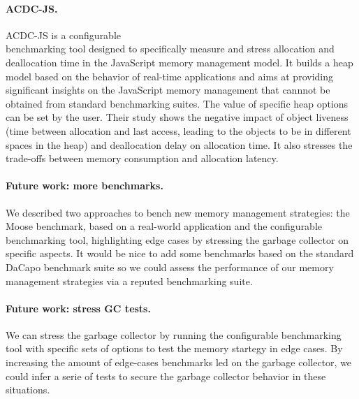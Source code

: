 \documentclass[10pt, sigplan]{acmart}
\begin{document}
%


\paragraph{ACDC-JS.}
ACDC-JS \cite{ACDCJS} is a configurable \\benchmarking tool designed to specifically measure and stress allocation and deallocation time in the JavaScript memory management model. 
It builds a heap model based on the behavior of real-time applications and aims at providing significant insights on the JavaScript memory management that cannnot be obtained from standard benchmarking suites. The value of specific heap options can be set by the user. 
Their study shows the negative impact of object liveness (time between allocation and last access, leading to the objects to be in different spaces in the heap) and deallocation delay on allocation time. It also stresses the trade-offs between memory consumption and allocation latency.

\paragraph{Future work: more benchmarks.}
We described two approaches to bench new memory management strategies: the Moose benchmark, based on a real-world application and the configurable benchmarking tool, highlighting edge cases by stressing the garbage collector on specific aspects. It would be nice to add some benchmarks based on the standard DaCapo benchmark suite so we could assess the performance of our memory management strategies via a reputed benchmarking suite.

\paragraph{Future work: stress GC tests.}
We can stress the garbage collector by running the configurable benchmarking tool with specific sets of options to test the memory startegy in edge cases. By increasing the amount of edge-cases benchmarks led on the garbage collector, we could infer a serie of tests to secure the garbage collector behavior in these situations.
\end{document}
